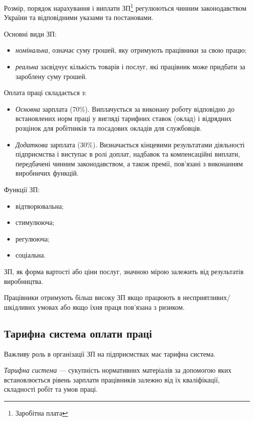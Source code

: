 \documentclass[a5paper,10pt,notitlepage,pdftex,headsepline]{scrartcl}
\begin{document}
    Розмір, порядок нарахування і виплати ЗП\footnote{Заробітна плата}
    регулюються чинним законодавством України та відповідними указами та
    постановами.

    Основні види ЗП:
    \begin{itemize}
      \item \emph{номінальна}, означає суму грошей, яку отримують працівники
        за свою працю;
      \item \emph{реальна} засвідчує кількість товарів і послуг, які працівник
        може придбати за зароблену суму грошей.
    \end{itemize}

    Оплата праці складається з:
    \begin{itemize}
      \item \emph{Основна} зарплата (70\%).
        Виплачується за виконану роботу відповідно до встановлених норм праці
        у вигляді тарифних ставок (оклад) і відрядних розцінок для робітників
        та посадових окладів для службовців.
      \item \emph{Додаткова} зарплата (30\%).
        Визначається кінцевими результатами діяльності підприємства і виступає
        в ролі доплат, надбавок та компенсаційні виплати, передбачені чинним
        законодавством, а також премії, пов’язані з виконанням виробничих
        функцій.
    \end{itemize}

    Функції ЗП:
    \begin{itemize}
      \item відтворювальна;
      \item стимулююча;
      \item регулююча;
      \item соціальна.
    \end{itemize}

    ЗП, як форма вартості або ціни послуг, значною мірою залежить від
    результатів виробництва.

    Працівники отримують більш високу ЗП якщо працюють в
    несприятливих/шкідливих умовах або якщо їхня праця пов’язана з ризиком.
  \subsection{Тарифна система оплати праці}
    Важливу роль в організації ЗП на підприємствах має тарифна система.

    \emph{Тарифна система} --- сукупність нормативних матеріалів за допомогою
    яких встановлюється рівень зарплати працівників залежно від їх
    кваліфікації, складності робіт та умов праці.
\end{document}
